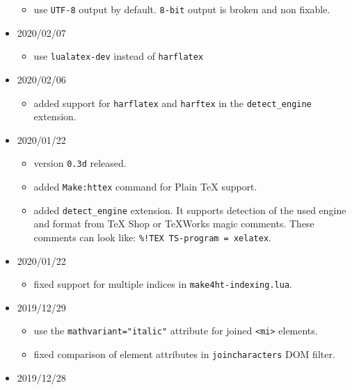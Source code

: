 \begin{itemize}
  \begin{itemize}
  \tightlist
  \item
    use \texttt{UTF-8} output by default. \texttt{8-bit} output is
    broken and non fixable.
  \end{itemize}
\item
  2020/02/07

  \begin{itemize}
  \tightlist
  \item
    use \texttt{lualatex-dev} instead of \texttt{harflatex}
  \end{itemize}
\item
  2020/02/06

  \begin{itemize}
  \tightlist
  \item
    added support for \texttt{harflatex} and \texttt{harftex} in the
    \texttt{detect\_engine} extension.
  \end{itemize}
\item
  2020/01/22

  \begin{itemize}
  \tightlist
  \item
    version \texttt{0.3d} released.
  \item
    added \texttt{Make:httex} command for Plain TeX support.
  \item
    added \texttt{detect\_engine} extension. It supports detection of
    the used engine and format from TeX Shop or TeXWorks magic comments.
    These comments can look like:
    \texttt{\%!TEX\ TS-program\ =\ xelatex}.
  \end{itemize}
\item
  2020/01/22

  \begin{itemize}
  \tightlist
  \item
    fixed support for multiple indices in \texttt{make4ht-indexing.lua}.
  \end{itemize}
\item
  2019/12/29

  \begin{itemize}
  \tightlist
  \item
    use the \texttt{mathvariant="italic"} attribute for joined
    \texttt{\textless{}mi\textgreater{}} elements.
  \item
    fixed comparison of element attributes in \texttt{joincharacters}
    DOM filter.
  \end{itemize}
\item
  2019/12/28


\end{itemize}
